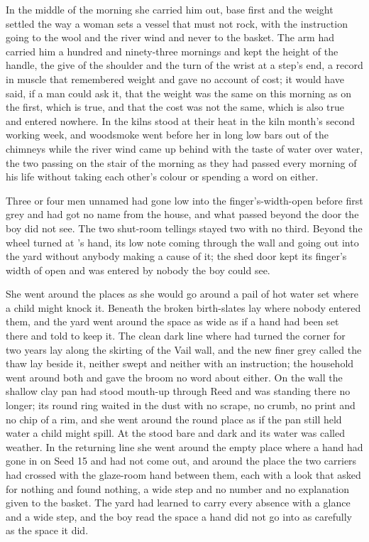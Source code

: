 \scenebreak

In the middle of the morning she carried him out, base first and the weight settled the way a woman sets a vessel that must not rock, with the instruction going to the wool and the river wind and never to the basket. The arm had carried him a hundred and ninety-three mornings and kept the height of the handle, the give of the shoulder and the turn of the wrist at a step's end, a record in muscle that remembered weight and gave no account of cost; it would have said, if a man could ask it, that the weight was the same on this morning as on the first, which is true, and that the cost was not the same, which is also true and entered nowhere. In  the kilns stood at their heat in the kiln month's second working week, and woodsmoke went before her in long low bars out of the chimneys while the river wind came up behind with the taste of water over water, the two passing on the stair of the morning as they had passed every morning of his life without taking each other's colour or spending a word on either.

Three or four men unnamed had gone low into the finger's-width-open  before first grey and had got no name from the house, and what passed beyond the door the boy did not see. The two shut-room tellings stayed two with no third. Beyond  the wheel turned at 's hand, its low note coming through the wall and going out into the yard without anybody making a cause of it; the shed door kept its finger's width of open and was entered by nobody the boy could see.

She went around the places as she would go around a pail of hot water set where a child might knock it. Beneath  the broken birth-slates lay where nobody entered them, and the yard went around the space as wide as if a hand had been set there and told to keep it. The clean dark line where  had turned the corner for two years lay along the skirting of the Vail wall, and the new finer grey called the thaw lay beside it, neither swept and neither with an instruction; the household went around both and gave the broom no word about either. On the wall the shallow clay pan had stood mouth-up through Reed and was standing there no longer; its round ring waited in the dust with no scrape, no crumb, no print and no chip of a rim, and she went around the round place as if the pan still held water a child might spill. At  the  stood bare and dark and its water was called weather. In the returning line she went around the empty place where a hand had gone in on Seed 15 and had not come out, and around the place the two carriers had crossed with the glaze-room hand between them, each with a look that asked for nothing and found nothing, a wide step and no number and no explanation given to the basket. The yard had learned to carry every absence with a glance and a wide step, and the boy read the space a hand did not go into as carefully as the space it did.

